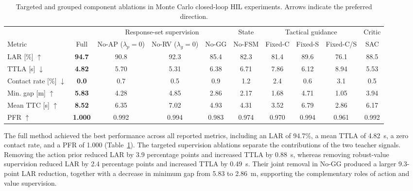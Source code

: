 \documentclass[sensors,article,submit,moreauthors]{Definitions/mdpi}
\begin{document}
\begin{table}[!htbp]
\centering
\scriptsize
\setlength{\tabcolsep}{2.4pt}
\renewcommand{\arraystretch}{1.10}
\caption{Targeted and grouped component ablations in Monte Carlo closed-loop
HIL experiments. Arrows indicate the preferred direction.}
\label{tab:ablation}
\begin{tabular}{@{}lccccccccc@{}}
\toprule
& & \multicolumn{3}{c}{Response-set supervision}
& \multicolumn{1}{c}{State}
& \multicolumn{3}{c}{Tactical guidance}
& \multicolumn{1}{c}{Critic} \\
\cmidrule(lr){3-5}
\cmidrule(lr){6-6}
\cmidrule(lr){7-9}
\cmidrule(l){10-10}
Metric
& Full
& \shortstack{No-AP\\($\lambda_p=0$)}
& \shortstack{No-RV\\($\lambda_g=0$)}
& No-GG
& No-FSM
& Fixed-C
& Fixed-S
& Fixed-C/S
& SAC \\
\midrule
LAR [\%] $\uparrow$
& \textbf{94.7} & 90.8 & 92.3 & 85.4 & 82.3 & 81.4 & 89.6 & 76.1 & 88.5 \\
TTLA [s] $\downarrow$
& \textbf{4.82} & 5.70 & 5.31 & 6.38 & 6.71 & 7.86 & 6.12 & 8.94 & 5.53 \\
Contact rate [\%] $\downarrow$
& \textbf{0.0} & 0.7 & 0.5 & 0.9 & 1.2 & 2.4 & 0.6 & 3.1 & 0.5 \\
Min. gap [m] $\uparrow$
& \textbf{5.83} & 4.28 & 4.85 & 2.86 & 2.17 & 1.68 & 4.71 & 1.05 & 3.94 \\
Mean TTC [s] $\uparrow$
& \textbf{8.52} & 6.35 & 7.02 & 4.93 & 4.31 & 3.52 & 6.79 & 2.86 & 6.17 \\
PFR $\uparrow$
& \textbf{1.000} & 0.992 & 0.994 & 0.983 & 0.974 & 0.970 & 0.994 & 0.961 & 0.992 \\
\bottomrule
\end{tabular}
\end{table}



The full method achieved the best performance across all reported metrics,
including an LAR of 94.7\%, a mean TTLA of 4.82~s, a zero contact rate, and a
PFR of 1.000 (Table~\ref{tab:ablation}). The targeted supervision ablations
separate the contributions of the two teacher signals. Removing the action
prior reduced LAR by 3.9 percentage points and increased TTLA by 0.88~s,
whereas removing robust-value supervision reduced LAR by 2.4 percentage
points and increased TTLA by 0.49~s. Their joint removal in No-GG produced a
larger 9.3-point LAR reduction, together with a decrease in minimum gap from
5.83 to 2.86~m, supporting the complementary roles of action and value
supervision.
\end{document}
